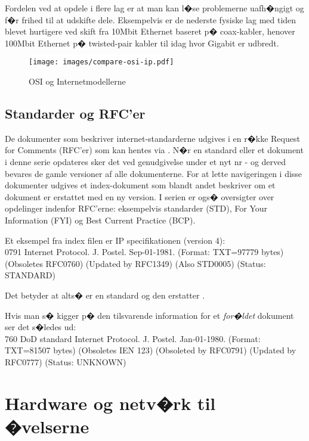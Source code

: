 \documentclass[a4paper,11pt,notitlepage]{oevelser}
\begin{document}
Fordelen ved at opdele i flere lag er at man kan l�se problemerne
uafh�ngigt og f�r frihed til at udskifte dele. Eksempelvis er de
nederste fysiske lag med tiden blevet hurtigere ved skift fra 10Mbit
Ethernet baseret p� coax-kabler, henover 100Mbit Ethernet p�
twisted-pair kabler til idag hvor Gigabit er udbredt.


\begin{figure}[H]
\label{fig:osi}
\begin{center}
\colorbox{white}{\texttt{[image: images/compare-osi-ip.pdf]}}
\end{center}
\caption{OSI og Internetmodellerne}
\end{figure}


\section*{\color{titlecolor}Standarder og RFC'er}
De dokumenter som beskriver internet-standarderne udgives i en r�kke
Request for Comments (RFC'er) som kan hentes via
. N�r en standard eller et dokument i
denne serie opdateres sker det ved genudgivelse under et nyt nr - og
derved bevares de gamle versioner af alle dokumenterne. For at lette
navigeringen i disse dokumenter udgives et index-dokument som blandt
andet beskriver om et dokument er erstattet med en ny version. I
serien er ogs� oversigter over opdelinger indenfor RFC'erne:
eksempelvis standarder (STD), For Your Information (FYI) og Best
Current Practice (BCP).

Et eksempel fra index filen er IP specifikationen (version 4):\\
0791 Internet Protocol. J. Postel. Sep-01-1981. (Format: TXT=97779
bytes) (Obsoletes RFC0760) (Updated by RFC1349) (Also STD0005)
(Status: STANDARD)

Det betyder at \cite{RFC0791} alts� er en standard og den erstatter
\cite{RFC0760}.

Hvis man s� kigger p� den tilsvarende information for et
\emph{for�ldet} dokument ser det s�ledes ud:\\
760 DoD standard Internet Protocol. J. Postel. Jan-01-1980. (Format:
TXT=81507 bytes) (Obsoletes IEN 123) (Obsoleted by RFC0791) (Updated
by RFC0777) (Status: UNKNOWN)


\chapter*{\color{titlecolor}Hardware og netv�rk til �velserne}
\end{document}
